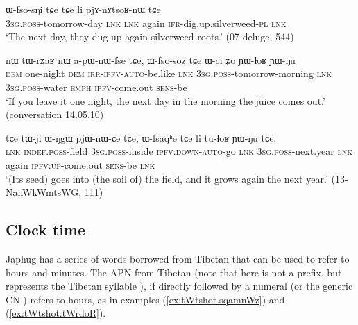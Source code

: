 \begin{exe}
\ex \label{ex:WfsosNi}
\gll  ɯ-fso-sŋi tɕe tɕe li pjɤ-nɤtsoʁ-nɯ tɕe \\ 
 \textsc{3sg}.\textsc{poss}-tomorrow-day \textsc{lnk} \textsc{lnk} again \textsc{ifr}-dig.up.silverweed-\textsc{pl}  \textsc{lnk}\\
\glt `The next day, they dug up again silverweed roots.' (07-deluge, 544)
\end{exe}
  
\begin{exe}
\ex \label{ex:Wfsosoz}
\gll nɯ tɯ-rʑaʁ nɯ a-pɯ-nɯ-fse tɕe, ɯ-fso-soz tɕe ɯ-ci ʑo ɲɯ-ɬoʁ ɲɯ-ŋu  \\
 \textsc{dem} one-night \textsc{dem} \textsc{irr}-\textsc{ipfv}-\textsc{auto}-be.like \textsc{lnk} \textsc{3sg}.\textsc{poss}-tomorrow-morning \textsc{lnk} \textsc{3sg}.\textsc{poss}-water \textsc{emph} \textsc{ipfv}-come.out \textsc{sens}-be \\
\glt `If you leave it one night, the next day in the morning the juice comes out.' (conversation 14.05.10)
\end{exe}
   
\begin{exe}
\ex \label{ex:Wfsqaqhe}
\gll   tɕe tɯ-ji ɯ-ŋgɯ pjɯ-nɯ-ɕe tɕe, ɯ-fsaqʰe tɕe li tu-ɬoʁ ɲɯ-ŋu tɕe.   \\
 \textsc{lnk} \textsc{indef}.\textsc{poss}-field \textsc{3sg}.\textsc{poss}-inside \textsc{ipfv}:\textsc{down}-\textsc{auto}-go  \textsc{lnk} \textsc{3sg}.\textsc{poss}-next.year \textsc{lnk} again \textsc{ipfv}:\textsc{up}-come.out \textsc{sens}-be \textsc{lnk}  \\
\glt `(Its seed) goes into (the soil of) the field, and it grows again the next year.' (13-NanWkWmtsWG, 111)
\end{exe}
    
 \subsection{Clock time} \label{sec:hours}
Japhug has a series of words borrowed from Tibetan that can be used to refer to hours and minutes.  The APN  from Tibetan  (note that  here is not a prefix, but represents the Tibetan syllable  ), if directly followed by a numeral (or the generic CN ) refers to hours, as in examples (\ref{ex:tWtshot.sqamnWz}) and (\ref{ex:tWtshot.tWrdoR}).

